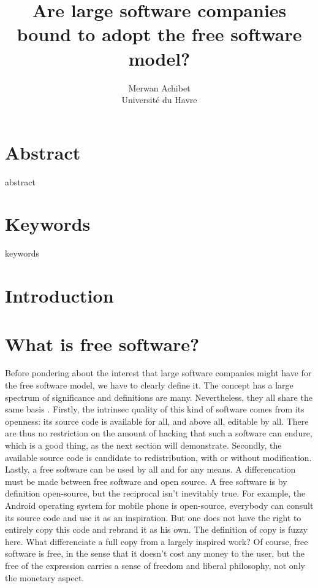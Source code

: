 \documentclass[12pt]{article}
\title{Are large software companies bound to adopt the free software model?}
\author{Merwan Achibet\\Université du Havre}
\date{}
\begin{document}
\maketitle
\newpage

\tableofcontents
\newpage

\section*{Abstract}

abstract

\section*{Keywords}

keywords

\newpage

\section*{Introduction}

\section{What is free software?}

Before pondering about the interest that large software companies
might have for the free software model, we have to clearly define
it. The concept has a large spectrum of significance and definitions
are many. Nevertheless, they all share the same basis
\cite{sers}. Firstly, the intrinsec quality of this kind of software
comes from its openness: its source code is available for all, and
above all, editable by all. There are thus no restriction on the
amount of hacking that such a software can endure, which is a good
thing, as the next section will demonstrate. Secondly, the available
source code is candidate to redistribution, with or without
modification. Lastly, a free software can be used by all and for any
means. A differencation must be made between free software and open
source. A free software is by definition open-source, but the
reciprocal isn't inevitably true. For example, the Android operating
system for mobile phone is open-source, everybody can consult its
source code and use it as an inspiration. But one does not have the
right to entirely copy this code and rebrand it as his own. The
definition of copy is fuzzy here. What differenciate a full copy from
a largely inspired work? Of course, free software is free, in the
sense that it doesn't cost any money to the user, but the free of the
expression carries a sense of freedom and liberal philosophy, not only
the monetary aspect.
\end{document}
